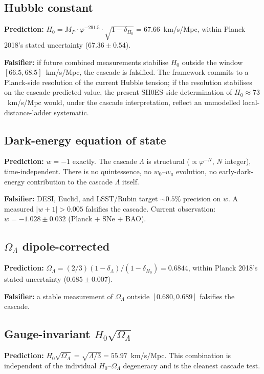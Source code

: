 \documentclass[11pt]{article}
\theoremstyle{plain}
\theoremstyle{definition}
\theoremstyle{remark}
\begin{document}
\subsection{Hubble constant}

\textbf{Prediction:} $H_0 = M_P \cdot \varphi^{-291.5} \cdot \sqrt{1 - \delta_{H_0}} = 67.66$~km/s/Mpc, within Planck 2018's stated uncertainty ($67.36 \pm 0.54$).

\textbf{Falsifier:} if future combined measurements stabilise $H_0$ outside the window $[66.5, 68.5]$~km/s/Mpc, the cascade is falsified. The framework commits to a Planck-side resolution of the current Hubble tension; if the resolution stabilises on the cascade-predicted value, the present SH0ES-side determination of $H_0 \approx 73$~km/s/Mpc would, under the cascade interpretation, reflect an unmodelled local-distance-ladder systematic.

\subsection{Dark-energy equation of state}

\textbf{Prediction:} $w = -1$ exactly. The cascade $\Lambda$ is structural ($\propto \varphi^{-N}$, $N$ integer), time-independent. There is no quintessence, no $w_0$--$w_a$ evolution, no early-dark-energy contribution to the cascade $\Lambda$ itself.

\textbf{Falsifier:} DESI, Euclid, and LSST/Rubin target $\sim 0.5\%$ precision on $w$. A measured $|w + 1| > 0.005$ falsifies the cascade. Current observation: $w = -1.028 \pm 0.032$ (Planck + SNe + BAO).

\subsection{$\Omega_\Lambda$ dipole-corrected}

\textbf{Prediction:} $\Omega_\Lambda = (2/3)(1 - \delta_\Lambda)/(1 - \delta_{H_0}) = 0.6844$, within Planck 2018's stated uncertainty ($0.685 \pm 0.007$).

\textbf{Falsifier:} a stable measurement of $\Omega_\Lambda$ outside $[0.680, 0.689]$ falsifies the cascade.

\subsection{Gauge-invariant $H_0 \sqrt{\Omega_\Lambda}$}

\textbf{Prediction:} $H_0 \sqrt{\Omega_\Lambda} = \sqrt{\Lambda/3} = 55.97$~km/s/Mpc. This combination is independent of the individual $H_0$--$\Omega_\Lambda$ degeneracy and is the cleanest cascade test.
\end{document}
